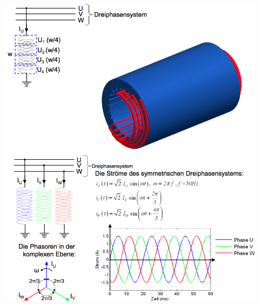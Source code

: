 \begin{minipage}{0.5 \linewidth}
\includegraphics[width = \linewidth]{./Pics/VL89/Drehfeld5}
\includegraphics[width = \linewidth]{./Pics/VL89/Drehfeld7}
\end{minipage}
